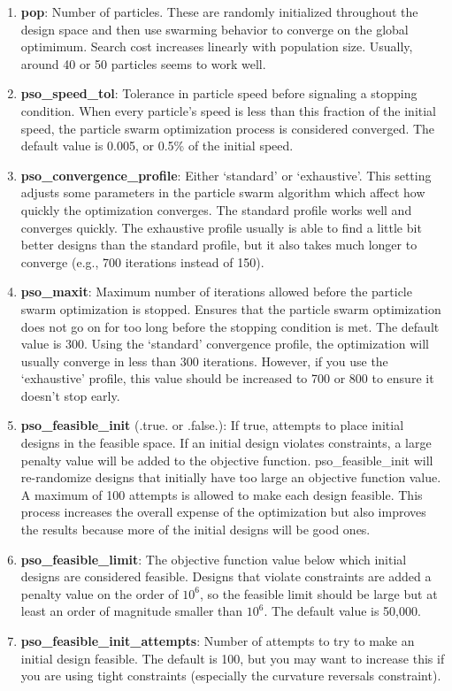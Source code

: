 \documentclass[11pt]{article}
\begin{document}
\begin{enumerate}
\item{\textbf{pop}: Number of particles.  These are randomly initialized throughout the
design space and then use swarming behavior to converge on the global optimimum.  Search
cost increases linearly with population size.  Usually, around 40 or 50 particles seems to
work well.}
\item{\textbf{pso\_speed\_tol}: Tolerance in particle speed before signaling a stopping
condition.  When every particle's speed is less than this fraction of the initial speed,
the particle swarm optimization process is considered converged. The default value is
0.005, or 0.5\% of the initial speed.}
\item{\textbf{pso\_convergence\_profile}: Either `standard' or `exhaustive'.  This setting
adjusts some parameters in the particle swarm algorithm which affect how quickly the
optimization converges.  The standard profile works well and converges quickly.  The
exhaustive profile usually is able to find a little bit better designs than the standard
profile, but it also takes much longer to converge (e.g., 700 iterations instead of 150).}
\item{\textbf{pso\_maxit}: Maximum number of iterations allowed before the particle swarm
optimization is stopped.  Ensures that the particle swarm optimization does not go on for
too long before the stopping condition is met. The default value is 300.  Using the 
`standard' convergence profile, the optimization will usually converge in less than 300 
iterations.  However, if you use the `exhaustive' profile, this value should be increased
to 700 or 800 to ensure it doesn't stop early.}
\item{\textbf{pso\_feasible\_init} (.true. or .false.): If true, attempts to place initial
designs in the feasible space.  If an initial design violates constraints, a large penalty
value will be added to the objective function.  pso\_feasible\_init will re-randomize
designs that initially have too large an objective function value.  A maximum of 100 
attempts is allowed to make each design feasible. This process increases the overall 
expense of the optimization but also improves the results because more of the initial 
designs will be good ones.}
\item{\textbf{pso\_feasible\_limit}: The objective function value below which initial
designs are considered feasible.  Designs that violate constraints are added a penalty
value on the order of $10^6$, so the feasible limit should be large but at least an order
of magnitude smaller than $10^6$.  The default value is 50,000.}
\item{\textbf{pso\_feasible\_init\_attempts}: Number of attempts to try to make an initial
design feasible.  The default is 100, but you may want to increase this if you are using
tight constraints (especially the curvature reversals constraint).}
\end{enumerate}
\end{document}
